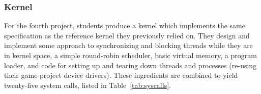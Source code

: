 \subsubsection{\pebbles Kernel}

For the fourth project, students %
produce a kernel which implements the
same specification as the reference kernel
they previously relied on.
They design and implement some approach to
synchronizing and blocking threads while
they are in kernel space,
a simple round-robin scheduler,
basic virtual memory,
a program loader,
and code for setting up and tearing down
threads and processes
(re-using their game-project device drivers).
These ingredients are combined to yield
twenty-five system calls,
listed in Table~\ref{tab:syscalls}.

